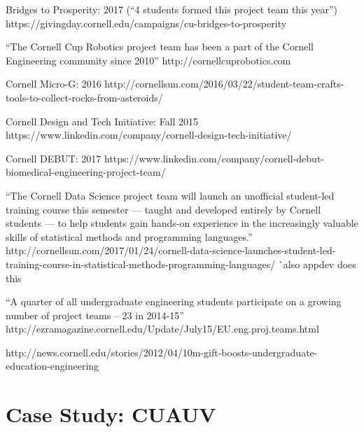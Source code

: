 \documentclass[12pt]{article}
\begin{document}
Bridges to Prosperity: 2017 (``4 students formed this project team this year'')
https://givingday.cornell.edu/campaigns/cu-bridges-to-prosperity

``The Cornell Cup Robotics project team has been a part of the Cornell Engineering community since 2010''
http://cornellcuprobotics.com

Cornell Micro-G: 2016
http://cornellsun.com/2016/03/22/student-team-crafts-tools-to-collect-rocks-from-asteroids/

Cornell Design and Tech Initiative: Fall 2015
https://www.linkedin.com/company/cornell-design-tech-initiative/

Cornell DEBUT: 2017
https://www.linkedin.com/company/cornell-debut-biomedical-engineering-project-team/




``The Cornell Data Science project team will launch an unofficial student-led training course this semester — taught and developed entirely by Cornell students — to help students gain hands-on experience in the increasingly valuable skills of statistical methods and programming languages.''
http://cornellsun.com/2017/01/24/cornell-data-science-launches-student-led-training-course-in-statistical-methods-programming-languages/
^^ also appdev does this

``A quarter of all undergraduate engineering students participate on a growing number of project teams -- 23 in 2014-15'' http://ezramagazine.cornell.edu/Update/July15/EU.eng.proj.teams.html


http://news.cornell.edu/stories/2012/04/10m-gift-boosts-undergraduate-education-engineering

\section{Case Study: CUAUV}
\end{document}
